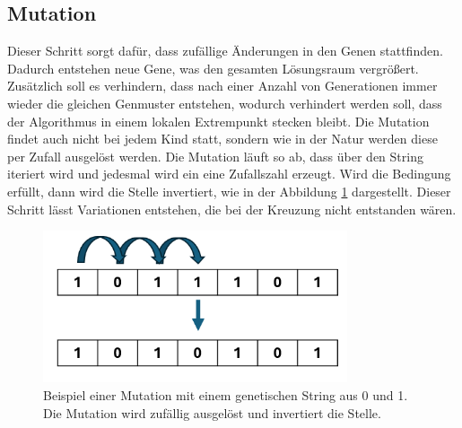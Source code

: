 %
%
%
%
\subsection{Mutation
\label{buch:paper:varalg:subsection:mutation}}
Dieser Schritt sorgt dafür, dass zufällige Änderungen in 
den Genen stattfinden. Dadurch entstehen neue Gene, was den 
gesamten Lösungsraum vergrößert. Zusätzlich soll es verhindern,
dass nach einer Anzahl von Generationen immer wieder die
gleichen Genmuster entstehen, wodurch verhindert werden soll, dass 
der Algorithmus in einem lokalen Extrempunkt stecken bleibt. 
Die Mutation findet auch nicht bei jedem Kind
statt, sondern wie in der Natur werden diese per Zufall
ausgelöst werden. Die Mutation läuft so ab, dass über den String
iteriert wird und jedesmal wird ein eine Zufallszahl erzeugt. Wird 
die Bedingung erfüllt, dann wird die Stelle invertiert, wie in der
Abbildung \ref{fig:mutation_genetic_string} dargestellt. Dieser Schritt 
lässt Variationen entstehen, die bei der Kreuzung nicht entstanden wären. 
\begin{figure}
	\centering
	\includegraphics[width=0.8\textwidth]{
        papers/varalg/images/teil3/09GeneticStringMutation.png
        }
	\caption{
	Beispiel einer Mutation mit einem genetischen String aus 0 und 1. Die
	Mutation wird zufällig ausgelöst und invertiert die Stelle.
	}
	\label{fig:mutation_genetic_string}
\end{figure}

